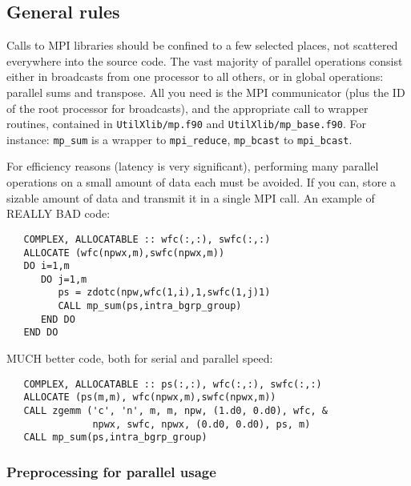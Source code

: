 \documentclass[12pt,a4paper]{article}
\begin{document}
\subsection{General rules}

Calls to MPI libraries should be confined to a few selected places,
not scattered everywhere into the source code. The vast majority
of parallel operations consist either in broadcasts from one processor
to all others, or in global operations: parallel sums and transpose.
All you need is the MPI communicator (plus the ID of the root processor
for broadcasts), and the appropriate call to wrapper routines, contained
in {\tt UtilXlib/mp.f90} and {\tt UtilXlib/mp\_base.f90}.
For instance: {\tt mp\_sum} is a wrapper to {\tt mpi\_reduce},
{\tt mp\_bcast} to {\tt mpi\_bcast}.

For efficiency reasons (latency is very significant), performing many
parallel operations on a small amount of data each must be avoided.
If you can, store a sizable amount of data and transmit it in a single
MPI call. An example of REALLY BAD code:
\begin{verbatim}
   COMPLEX, ALLOCATABLE :: wfc(:,:), swfc(:,:)
   ALLOCATE (wfc(npwx,m),swfc(npwx,m))
   DO i=1,m
      DO j=1,m
         ps = zdotc(npw,wfc(1,i),1,swfc(1,j)1)
         CALL mp_sum(ps,intra_bgrp_group)
      END DO
   END DO
\end{verbatim}
MUCH better code, both for serial and parallel speed:
\begin{verbatim}
   COMPLEX, ALLOCATABLE :: ps(:,:), wfc(:,:), swfc(:,:)
   ALLOCATE (ps(m,m), wfc(npwx,m),swfc(npwx,m))
   CALL zgemm ('c', 'n', m, m, npw, (1.d0, 0.d0), wfc, &
               npwx, swfc, npwx, (0.d0, 0.d0), ps, m)
   CALL mp_sum(ps,intra_bgrp_group)
\end{verbatim}

\subsubsection{Preprocessing for parallel usage}
\end{document}
